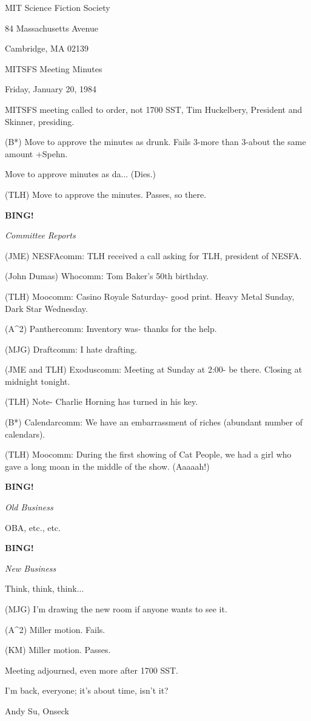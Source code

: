 \documentclass[12pt]{article}
\newcommand{\bing}{{\bf BING!} }
\newcommand{\goto}[1]{\bing \vskip 12pt \centerline{{\em{#1}}}}
\begin{document}
\begin{center}

MIT Science Fiction Society 

84 Massachusetts Avenue

Cambridge, MA 02139

\vspace{12pt}

MITSFS Meeting Minutes 

Friday, January 20, 1984

\end{center}
 
\vspace{18pt}

\setlength{\parskip}{6pt}

\noindent
MITSFS meeting called to order, not 1700 SST,
Tim Huckelbery, President and Skinner, presiding.

(B*) Move to approve the minutes as drunk. Fails 3-more than 3-about the same amount +Spehn.

Move to approve minutes as da... (Dies.)

(TLH) Move to approve the minutes. Passes, so there.

\goto{Committee Reports}

(JME) NESFAcomm: TLH received a call asking for TLH, president of NESFA.

(John Dumas) Whocomm: Tom Baker's 50th birthday.

(TLH) Moocomm: Casino Royale Saturday- good print. Heavy Metal Sunday, Dark Star Wednesday.

(A^2) Panthercomm: Inventory was- thanks for the help.

(MJG) Draftcomm: I hate drafting.

(JME and TLH) Exoduscomm: Meeting at Sunday at 2:00- be there. Closing at midnight tonight.

(TLH) Note- Charlie Horning has turned in his key.

(B*) Calendarcomm: We have an embarrassment of riches (abundant number of calendars).

(TLH) Moocomm: During the first showing of Cat People, we had a girl who gave a long moan in the middle of the show. (Aaaaah!)

\goto{Old Business}

OBA, etc., etc.

\goto{New Business}

Think, think, think...

(MJG) I'm drawing the new room if anyone wants to see it.

(A^2) Miller motion. Fails.

(KM) Miller motion. Passes.

\vspace{12pt}

\noindent
Meeting adjourned, even more after 1700 SST.

\vspace{18pt}

\centerline{I'm back, everyone; it's about time, isn't it?}
\centerline{Andy Su, Onseck}
\end{document}
